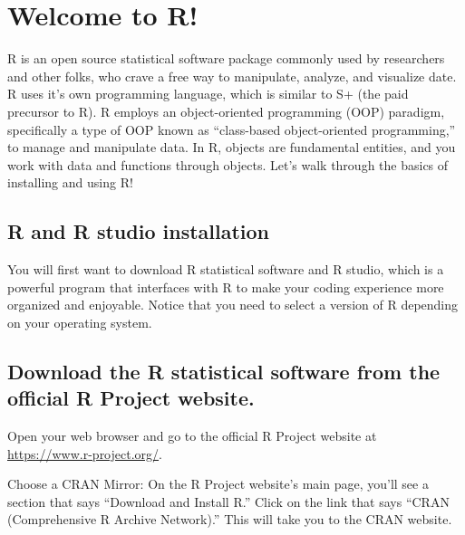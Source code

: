 \documentclass[
]{book}
\begin{document}
\hypertarget{welcome-to-r}{%
\chapter{Welcome to R!}\label{welcome-to-r}}

R is an open source statistical software package commonly used by researchers and other folks, who crave a free way to manipulate, analyze, and visualize date. R uses it's own programming language, which is similar to S+ (the paid precursor to R). R employs an object-oriented programming (OOP) paradigm, specifically a type of OOP known as ``class-based object-oriented programming,'' to manage and manipulate data. In R, objects are fundamental entities, and you work with data and functions through objects. Let's walk through the basics of installing and using R!

\hypertarget{r-and-r-studio-installation}{%
\section{R and R studio installation}\label{r-and-r-studio-installation}}

You will first want to download R statistical software and R studio, which is a powerful program that interfaces with R to make your coding experience more organized and enjoyable. Notice that you need to select a version of R depending on your operating system.

\hypertarget{download-the-r-statistical-software-from-the-official-r-project-website.}{%
\section{Download the R statistical software from the official R Project website.}\label{download-the-r-statistical-software-from-the-official-r-project-website.}}

Open your web browser and go to the official R Project website at \url{https://www.r-project.org/}.

Choose a CRAN Mirror: On the R Project website's main page, you'll see a section that says ``Download and Install R.'' Click on the link that says ``CRAN (Comprehensive R Archive Network).'' This will take you to the CRAN website.
\end{document}
